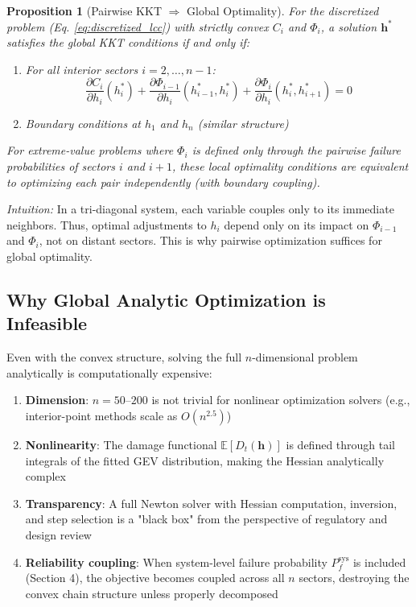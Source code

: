 \documentclass[review]{elsarticle}
\newtheorem{proposition}[theorem]{Proposition}
\begin{document}
\begin{proposition}[Pairwise KKT $\Rightarrow$ Global Optimality]
\label{prop:pairwise_kkt}
For the discretized problem (Eq. \eqref{eq:discretized_lcc}) with strictly convex $C_i$ and $\Phi_i$, a solution $\mathbf{h}^*$ satisfies the global KKT conditions if and only if:
\begin{enumerate}
\item For all interior sectors $i = 2, \ldots, n-1$:
\begin{equation}
\frac{\partial C_i}{\partial h_i}(h_i^*) + \frac{\partial \Phi_{i-1}}{\partial h_i}(h_{i-1}^*, h_i^*) + \frac{\partial \Phi_i}{\partial h_i}(h_i^*, h_{i+1}^*) = 0
\label{eq:kkt_interior}
\end{equation}

\item Boundary conditions at $h_1$ and $h_n$ (similar structure)
\end{enumerate}

For extreme-value problems where $\Phi_i$ is defined only through the pairwise failure probabilities of sectors $i$ and $i+1$, these local optimality conditions are equivalent to optimizing each pair independently (with boundary coupling).
\end{proposition}

\textit{Intuition:} In a tri-diagonal system, each variable couples only to its immediate neighbors. Thus, optimal adjustments to $h_i$ depend only on its impact on $\Phi_{i-1}$ and $\Phi_i$, not on distant sectors. This is why pairwise optimization suffices for global optimality.

\subsection{Why Global Analytic Optimization is Infeasible}

Even with the convex structure, solving the full $n$-dimensional problem analytically is computationally expensive:

\begin{enumerate}
\item \textbf{Dimension}: $n = 50$--$200$ is not trivial for nonlinear optimization solvers (e.g., interior-point methods scale as $O(n^{2.5})$)

\item \textbf{Nonlinearity}: The damage functional $\mathbb{E}[D_t(\mathbf{h})]$ is defined through tail integrals of the fitted GEV distribution, making the Hessian analytically complex

\item \textbf{Transparency}: A full Newton solver with Hessian computation, inversion, and step selection is a "black box" from the perspective of regulatory and design review

\item \textbf{Reliability coupling}: When system-level failure probability $P_f^{\text{sys}}$ is included (Section 4), the objective becomes coupled across all $n$ sectors, destroying the convex chain structure unless properly decomposed
\end{enumerate}
\end{document}
